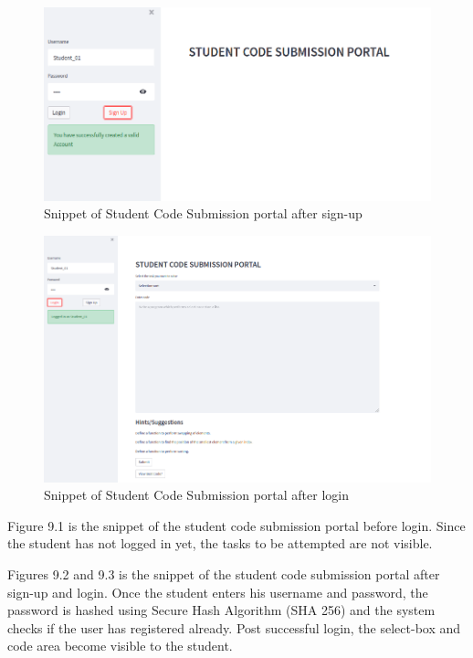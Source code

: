 \begin{figure}[H]
\centering
\includegraphics[scale=0.6,frame]{./figures/dep2.png}
\caption{Snippet of Student Code Submission portal after sign-up}
\label{fig1}
\end{figure}

\begin{figure}[H]
\centering
\includegraphics[scale=0.6,frame]{./figures/dep3.png}
\caption{Snippet of Student Code Submission portal after login}
\label{fig2}
\end{figure}


Figure 9.1 is the snippet of the student code submission portal before login. Since the student has not logged in yet, the tasks to be attempted are not visible.

Figures 9.2 and 9.3 is the snippet of the student code submission portal after sign-up and login. Once the student enters his username and password, the password is hashed using Secure Hash Algorithm (SHA 256) and the system checks if the user has registered already. Post successful login, the select-box and code area become visible to the student.  



